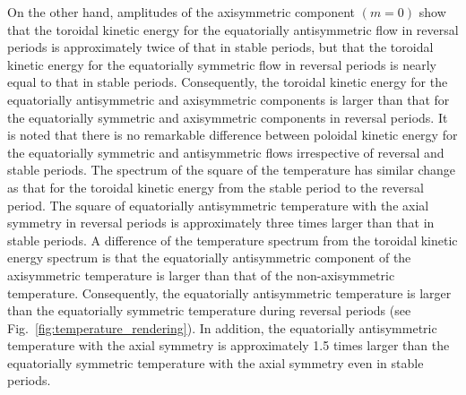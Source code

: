 {%
On the other hand, amplitudes of the axisymmetric component $(m = 0)$ show that the toroidal kinetic energy for the equatorially antisymmetric flow in reversal periods is approximately twice of that in stable periods, but that the toroidal kinetic energy for the equatorially symmetric flow in reversal periods is nearly equal to that in stable periods.
Consequently, the toroidal kinetic energy for the equatorially antisymmetric and axisymmetric components is larger than that for the equatorially symmetric and  axisymmetric components  in reversal periods.
It is noted that there is no remarkable difference between poloidal kinetic energy for the equatorially symmetric and antisymmetric flows irrespective of reversal and stable periods.
The spectrum of the square of the temperature has similar change as that for the toroidal kinetic energy from the stable period to the reversal period.
The square of equatorially antisymmetric temperature with the axial symmetry in reversal periods is approximately three times larger than that in stable periods.
}
A difference of the temperature spectrum from the toroidal kinetic energy spectrum is that the equatorially antisymmetric component of the axisymmetric temperature is larger than that of the non-axisymmetric temperature. %
Consequently, the equatorially antisymmetric temperature is larger than the equatorially symmetric temperature during reversal periods (see Fig.~\ref{fig:temperature_rendering}). 
{\color{red}
In addition, the equatorially antisymmetric temperature with the axial symmetry is approximately 1.5 times larger than the equatorially symmetric temperature with the axial symmetry even in stable periods.
}

